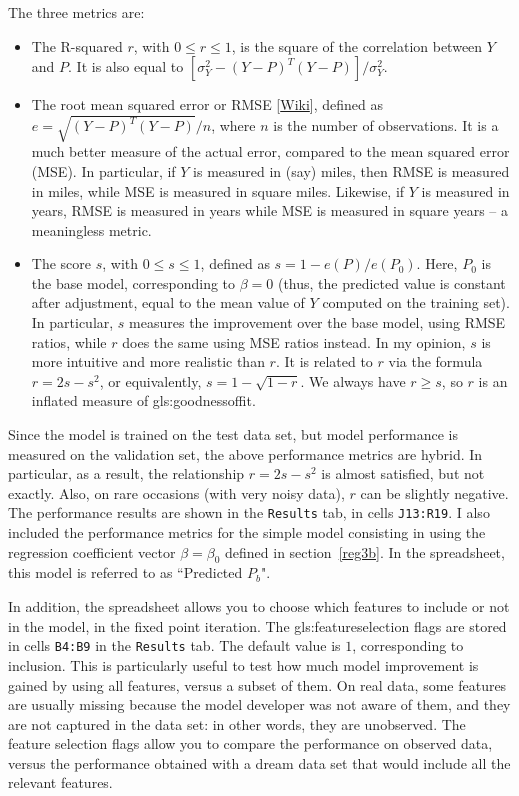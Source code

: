 \documentclass[oneside,10pt]{book}
\begin{document}
\noindent The three metrics are:
\begin{itemize}
\item The R-squared $r$, with $0\leq r\leq 1$, is the square of the correlation between $Y$ and $P$. It is also equal to $[\sigma^2_Y - (Y-P)^T (Y-P)]/\sigma_Y^2.$
\item The root mean squared error or RMSE [\href{https://en.wikipedia.org/wiki/Root-mean-square_deviation}{Wiki}], defined as $e = \sqrt{(Y-P)^T (Y-P)}/n$, where $n$ is the number of observations. It is a much better measure of the actual error, compared to the mean squared error (MSE). In particular, if $Y$ is measured in (say) miles,
then RMSE is measured in miles, while MSE is measured in square miles. Likewise, if $Y$ is measured in years, RMSE is measured in years  while MSE is measured in square years -- a meaningless metric.
\item The score $s$, with $0\leq s \leq 1$, defined as $s=1-e(P)/e(P_0)$. Here, $P_0$ is the base model, corresponding to $\beta=0$ (thus, the predicted value is constant after adjustment, equal to the mean value of $Y$ computed on the training set). In particular, $s$ measures the improvement over the base model, using RMSE ratios, while $r$ does the same using MSE ratios instead. In my opinion, $s$ is more intuitive and more realistic than $r$. It is related to $r$ via the formula $r=2s-s^2$, or equivalently, $s=1-\sqrt{1-r}$. We always have $r\geq s$, so $r$ is an inflated measure of  \gls{gls:goodnessoffit}.
\end{itemize}
Since the model is trained on the test data set, but model performance is measured on the validation set, the above performance metrics are hybrid. 
In particular, as a result, the relationship $r=2s-s^2$ is almost satisfied, but not exactly. Also, on rare occasions (with very noisy data), $r$ can be slightly negative. The performance results are shown in the \texttt{Results} tab, in cells \texttt{J13:R19}. I also included the performance metrics for the simple model consisting in using the regression coefficient vector $\beta=\beta_0$ 
defined in section~\ref{reg3b}. In the spreadsheet, this model is referred to as ``Predicted $P_b$".

In addition, the spreadsheet allows you to choose which features to include or not in the model, in the fixed point iteration. The \gls{gls:featureselection} flags are stored in cells \texttt{B4:B9} in the \texttt{Results} tab. The default value is $1$, corresponding to inclusion. This is particularly useful to test how much model improvement is gained by using all features, versus a subset of them. On real data, some features are usually missing because the model developer was not aware of them, and they are not captured in the data set: in other words, they are unobserved. The feature selection flags allow you to compare the performance on observed data, versus the performance obtained with a dream data set that would include all the relevant features.
\end{document}
